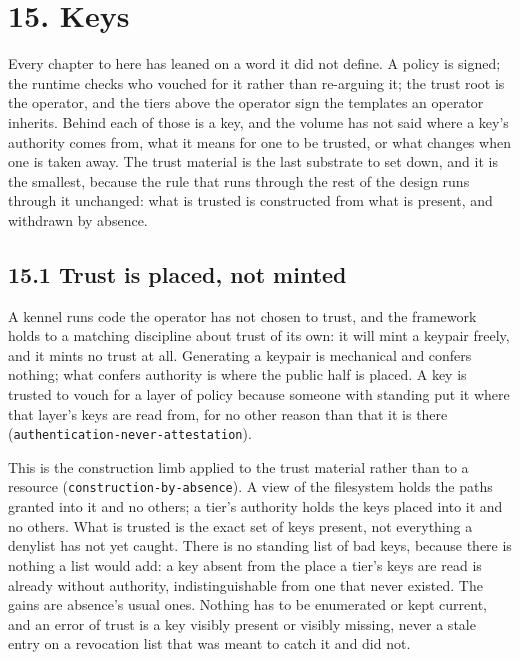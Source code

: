 \hypertarget{keys}{%
\chapter{15. Keys}\label{keys}}

Every chapter to here has leaned on a word it did not define. A policy
is signed; the runtime checks who vouched for it rather than re-arguing
it; the trust root is the operator, and the tiers above the operator
sign the templates an operator inherits. Behind each of those is a key,
and the volume has not said where a key's authority comes from, what it
means for one to be trusted, or what changes when one is taken away. The
trust material is the last substrate to set down, and it is the
smallest, because the rule that runs through the rest of the design runs
through it unchanged: what is trusted is constructed from what is
present, and withdrawn by absence.

\hypertarget{trust-is-placed-not-minted}{%
\section{15.1 Trust is placed, not
minted}\label{trust-is-placed-not-minted}}

A kennel runs code the operator has not chosen to trust, and the
framework holds to a matching discipline about trust of its own: it will
mint a keypair freely, and it mints no trust at all. Generating a
keypair is mechanical and confers nothing; what confers authority is
where the public half is placed. A key is trusted to vouch for a layer
of policy because someone with standing put it where that layer's keys
are read from, for no other reason than that it is there
(\texttt{authentication-never-attestation}).

This is the construction limb applied to the trust material rather than
to a resource (\texttt{construction-by-absence}). A view of the
filesystem holds the paths granted into it and no others; a tier's
authority holds the keys placed into it and no others. What is trusted
is the exact set of keys present, not everything a denylist has not yet
caught. There is no standing list of bad keys, because there is nothing
a list would add: a key absent from the place a tier's keys are read is
already without authority, indistinguishable from one that never
existed. The gains are absence's usual ones. Nothing has to be
enumerated or kept current, and an error of trust is a key visibly
present or visibly missing, never a stale entry on a revocation list
that was meant to catch it and did not.

